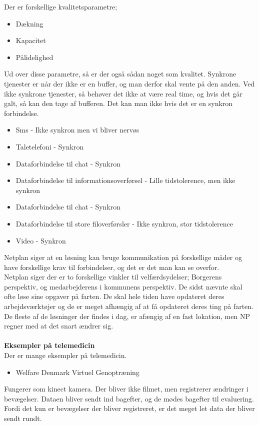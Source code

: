 Der er forskellige kvalitetsparametre; 
\begin{itemize}
\item Dækning
\item Kapacitet
\item Pålidelighed
\end{itemize}
Ud over disse parametre, så er der også sådan noget som kvalitet. Synkrone tjenester er når der ikke er en buffer, og man derfor skal vente på den anden. Ved ikke synkrone tjenester, så behøver det ikke at være real time, og hvis det går galt, så kan den tage af bufferen. Det kan man ikke hvis det er en synkron forbindelse. \\
\begin{itemize}
\item Sms - Ikke synkron men vi bliver nervøs
\item Taletelefoni - Synkron
\item Dataforbindelse til chat - Synkron
\item Dataforbindelse til informationsoverførsel - Lille tidstolerence, men ikke synkron
\item Dataforbindelse til chat - Synkron
\item Dataforbindelse til store filoverførsler - Ikke synkron, stor tidstolerence
\item Video - Synkron
\end{itemize}
Netplan siger at en løsning kan bruge kommunikation på forskellige måder og have forskellige krav til forbindelser, og det er det man kan se overfor.\\
Netplan siger der er to forskellige vinkler til velfærdsydelser; Borgerens perspektiv, og medarbejderens i kommunens perspektiv. De sidst nævnte skal ofte løse sine opgaver på farten. De skal hele tiden have opdateret deres arbejdsværktøjer og de er meget afhængig af at få opdateret deres ting på farten. De fleste af de løsninger der findes i dag, er afængig af en fast lokation, men NP regner med at det snart ændrer sig.\\ \\ 
\textbf{Eksempler på telemedicin}\\
Der er mange eksempler på telemedicin.\\
\begin{itemize}
\item Welfare Denmark Virtuel Genoptræning
\end{itemize}
Fungerer som kinect kamera. Der bliver ikke filmet, men registrerer ændringer i bevægelser. Dataen bliver sendt ind bagefter, og de mødes bagefter til evaluering. Fordi det kun er bevægelser der bliver registreret, er det meget let data der bliver sendt rundt. \\
